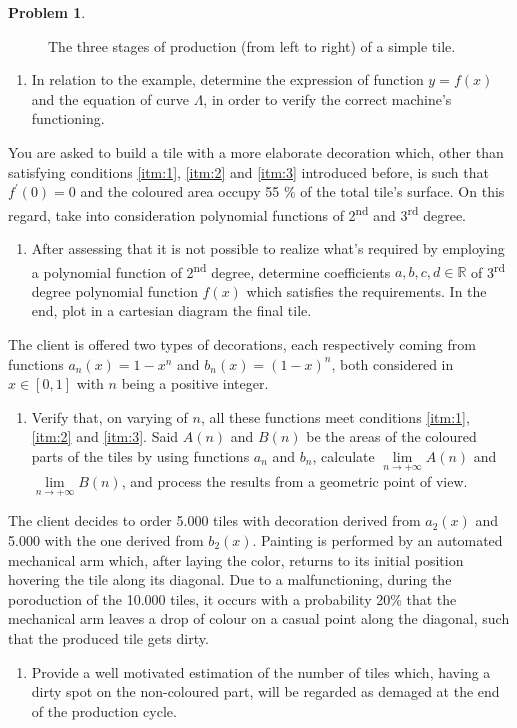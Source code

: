 \documentclass[a4paper,12pt,reqno]{amsart}
\theoremstyle{definition}
\newtheorem{problem}{Problem}
\begin{document}
\begin{problem}
\begin{figure}
   \caption{The three stages of production (from left to right) of a simple tile.}
   \label{fig:fshape}
   \end{figure}
%
\begin{enumerate}
\item In relation to the example, determine the expression of function $y=f(x)$ and the equation of curve
$\Lambda$, in order to verify the correct machine's functioning.
\end{enumerate}
You are asked to build a tile with a more elaborate decoration which, other than satisfying conditions \ref{itm:1},
\ref{itm:2} and \ref{itm:3} introduced before, is such that $f^\prime(0) = 0$ and the coloured area occupy
55 \% of the total tile's surface. On this regard, take into consideration polynomial functions of 2\textsuperscript{nd}
and 3\textsuperscript{rd} degree.
\begin{enumerate}[resume]
\item After assessing that it is not possible to realize what's required by employing a polynomial function of
2\textsuperscript{nd} degree, determine coefficients $a,b,c,d \in \mathbb{R}$ of 
3\textsuperscript{rd} degree polynomial function $f(x)$ which satisfies the requirements. In the end, plot in
a cartesian diagram the final tile.
\end{enumerate}
The client is offered two types of decorations, each respectively coming from functions $a_n(x)=1-x^n$
and $b_n(x)=(1-x)^n$, both considered in $x\in[0,1]$ with $n$ being a positive integer.
\begin{enumerate}[resume]
\item Verify that, on varying of $n$, all these functions meet conditions \ref{itm:1},
\ref{itm:2} and \ref{itm:3}. Said $A(n)$ and $B(n)$ be the areas of the coloured parts of the tiles by
using functions $a_n$ and $b_n$, calculate $\lim\limits_{n \to +\infty} A(n)$ and 
$\lim\limits_{n \to +\infty} B(n)$, and
process the results from a geometric point of view.
\end{enumerate}
The client decides to order 5.000 tiles with decoration derived from $a_2(x)$ and 5.000 with the one derived from
$b_2(x)$. Painting is performed by an automated mechanical arm which, after laying the color, returns to its
initial position hovering the tile along its diagonal. Due to a malfunctioning, during the poroduction of the 10.000
tiles, it occurs with a probability 20\% that the mechanical arm leaves a drop of colour on a casual point 
along the diagonal, such that the produced tile gets dirty.
\begin{enumerate}[resume]
\item Provide a well motivated estimation of the number of tiles which, having a dirty spot on the non-coloured
part, will be regarded as demaged at the end of the production cycle.
\end{enumerate}
\end{problem}
\end{document}
